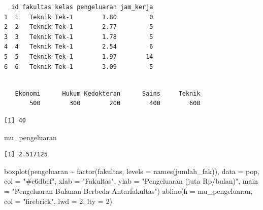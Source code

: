 \documentclass[
  indonesian,
  letterpaper,
]{book}
\newenvironment{Shaded}{\begin{snugshade}}{\end{snugshade}}
\newcommand{\AttributeTok}[1]{\textcolor[rgb]{0.40,0.45,0.13}{#1}}
\newcommand{\DecValTok}[1]{\textcolor[rgb]{0.68,0.00,0.00}{#1}}
\newcommand{\FunctionTok}[1]{\textcolor[rgb]{0.28,0.35,0.67}{#1}}
\newcommand{\NormalTok}[1]{\textcolor[rgb]{0.00,0.23,0.31}{#1}}
\newcommand{\SpecialCharTok}[1]{\textcolor[rgb]{0.37,0.37,0.37}{#1}}
\newcommand{\StringTok}[1]{\textcolor[rgb]{0.13,0.47,0.30}{#1}}
\begin{document}
\begin{verbatim}
  id fakultas kelas pengeluaran jam_kerja
1  1   Teknik Tek-1        1.80         0
2  2   Teknik Tek-1        2.77         5
3  3   Teknik Tek-1        1.78         5
4  4   Teknik Tek-1        2.54         6
5  5   Teknik Tek-1        1.97        14
6  6   Teknik Tek-1        3.09         5
\end{verbatim}

\begin{Shaded}
\end{Shaded}

\begin{verbatim}

   Ekonomi      Hukum Kedokteran      Sains     Teknik 
       500        300        200        400        600 
\end{verbatim}

\begin{Shaded}
\end{Shaded}

\begin{verbatim}
[1] 40
\end{verbatim}

\begin{Shaded}
\begin{Highlighting}[]
\NormalTok{mu\_pengeluaran}
\end{Highlighting}
\end{Shaded}

\begin{verbatim}
[1] 2.517125
\end{verbatim}

\begin{Shaded}
\begin{Highlighting}[]
\FunctionTok{boxplot}\NormalTok{(pengeluaran }\SpecialCharTok{\textasciitilde{}} \FunctionTok{factor}\NormalTok{(fakultas, }\AttributeTok{levels =} \FunctionTok{names}\NormalTok{(jumlah\_fak)), }\AttributeTok{data =}\NormalTok{ pop,}
\AttributeTok{col =} \StringTok{"\#c6dbef"}\NormalTok{, }\AttributeTok{xlab =} \StringTok{"Fakultas"}\NormalTok{, }\AttributeTok{ylab =} \StringTok{"Pengeluaran (juta Rp/bulan)"}\NormalTok{,}
\AttributeTok{main =} \StringTok{"Pengeluaran Bulanan Berbeda Antarfakultas"}\NormalTok{)}
\FunctionTok{abline}\NormalTok{(}\AttributeTok{h =}\NormalTok{ mu\_pengeluaran, }\AttributeTok{col =} \StringTok{"firebrick"}\NormalTok{, }\AttributeTok{lwd =} \DecValTok{2}\NormalTok{, }\AttributeTok{lty =} \DecValTok{2}\NormalTok{)}
\end{Highlighting}
\end{Shaded}
\end{document}
